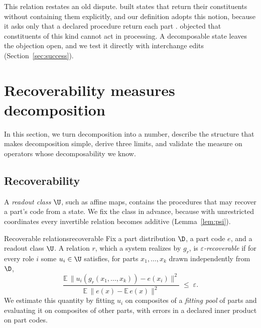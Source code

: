This relation restates an old dispute. \citet{smolensky1990} built states that return their constituents without containing them explicitly, and our definition adopts this notion, because it asks only that a declared procedure return each part \citep[cf.][]{vangelder1990}. \citet{fodor1990} objected that constituents of this kind cannot act in processing. A decomposable state leaves the objection open, and we test it directly with interchange edits (Section~\ref{sec:success}).

\section{Recoverability measures decomposition}
\label{sec:repcomp}

In this section, we turn decomposition into a number, describe the structure that makes decomposition simple, derive three limits, and validate the measure on operators whose decomposability we know.

\subsection{Recoverability}

A \emph{readout class} $\U$, such as affine maps, contains the procedures that may recover a part's code from a state. We fix the class in advance, because with unrestricted coordinates every invertible relation becomes additive (Lemma~\ref{lem:psi}).

\begin{defbox}{Recoverable relations}{recoverable}
Fix a part distribution $\D$, a part code $e$, and a readout class $\U$. A relation $r$, which a system realizes by $g_r$, is \emph{$\varepsilon$-recoverable} if for every role $i$ some $u_i \in \U$ satisfies, for parts $x_1, \ldots, x_k$ drawn independently from $\D$,
\begin{equation}
  \frac{\mathbb{E}\,\lVert u_i(g_r(x_1,\ldots,x_k)) - e(x_i) \rVert^2}{\mathbb{E}\,\lVert e(x) - \mathbb{E}\,e(x) \rVert^2} \;\le\; \varepsilon .
  \label{eq:recover}
\end{equation}
We estimate this quantity by fitting $u_i$ on composites of a \emph{fitting pool} of parts and evaluating it on composites of other parts, with errors in a declared inner product on part codes.
\end{defbox}

